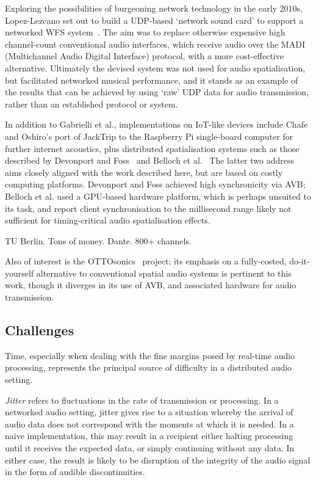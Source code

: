 Exploring the possibilities of burgeoning network technology in the early 2010s,
Lopez-Lezcano set out to build a UDP-based `network sound card' to support
a networked WFS system~\citep{lopez-lezcano_jack_2012}.
The aim was to replace otherwise expensive high channel-count conventional
audio interfaces, which receive audio over the MADI (Multichannel Audio Digital
Interface) protocol, with a more cost-effective alternative.
Ultimately the devised system was not used for audio spatialisation, but
facilitated networked musical performance, and it stands as an example of the
results that can be achieved by using `raw' UDP data for audio transmission,
rather than an established protocol or system.

In addition to Gabrielli et al., implementations on IoT-like devices include
Chafe and Oshiro's port of JackTrip to the Raspberry Pi single-board computer
for further internet acoustics, plus distributed spatialisation systems such as
those described by Devonport and Foss~\citep{devonport_distribution_2019} and
Belloch et al.~\citep{belloch_performance_2021}
The latter two address aims closely aligned with the work described here, but
are based on costly computing platforms.
Devonport and Foss achieved high synchronicity via AVB; Belloch et al. used a
GPU-based hardware platform, which is perhaps unsuited to its task, and report
client synchronisation to the millisecond range \textemdash{} likely not
sufficient for timing-critical audio spatialisation effects.

TU Berlin.
Tons of money.
Dante.
800+ channels.

Also of interest is the OTTOsonics~\citep{mitterhuber_ottosonics_2022}
project;
its emphasis on a fully-costed, do-it-yourself alternative to conventional
spatial audio systems is pertinent to this work, though it diverges in its use
of AVB, and associated hardware for audio transmission.

\subsection{Challenges}\label{subsec:challenges}

Time, especially when dealing with the fine margins posed by real-time audio
processing, represents the principal source of difficulty in a distributed
audio setting.

\textit{Jitter} refers to fluctuations in the rate of transmission or
processing.
In a networked audio setting, jitter gives rise to a situation whereby the
arrival of audio data does not correspond with the moments at which it is
needed.
In a naive implementation, this may result in a recipient either halting
processing until it receives the expected data, or simply continuing without
any data.
In either case, the result is likely to be disruption of the integrity of the
audio signal in the form of audible discontinuities.

